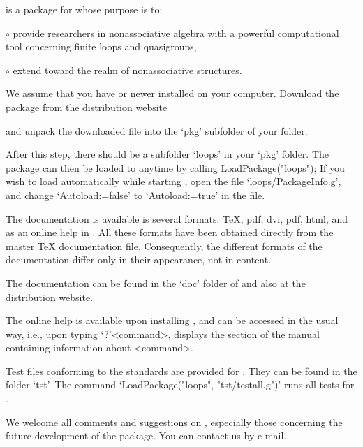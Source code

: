 
{\LOOPS} is a package for  whose purpose is to:
\beginlist%
\item{$\circ$}
    provide researchers in nonassociative algebra with a powerful computational tool
    concerning finite loops and quasigroups,
\item{$\circ$}
    extend {\GAP} toward the realm of nonassociative structures.
\endlist


We assume that you have  or newer installed on your computer.
Download the {\LOOPS} package from the distribution website


and unpack the downloaded file into the `pkg' subfolder of your {\GAP} folder.

After this step, there should be a subfolder `loops' in your `pkg' folder. The
package {\LOOPS} can then be loaded to {\GAP} anytime by calling
\begintt
LoadPackage("loops");
\endtt
If you wish to load {\LOOPS} automatically while starting {\GAP}, open the file
`loops/PackageInfo.g', and change `Autoload:=false' to
`Autoload:=true' in the file.


The documentation is available is several formats: \TeX, pdf, dvi, pdf, html,
and as an online help in {\GAP}. All these formats have been obtained directly
from the master {\TeX} documentation file. Consequently, the different formats
of the documentation differ only in their appearance, not in content.

The documentation can be found in the `doc' folder of {\LOOPS} and also at the
{\LOOPS} distribution website.

The online {\GAP} help is available upon installing {\LOOPS}, and can be
accessed in the usual way, i.e., upon typing `?'<command>, {\GAP} displays the
section of the {\LOOPS} manual containing information about <command>.


Test files conforming to the {\GAP} standards are provided for {\LOOPS}. They
can be found in the folder `tst'. The command `LoadPackage("loops",
"tst/testall.g")' runs all tests for {\LOOPS}.


We welcome all comments and suggestions on {\LOOPS}, especially those
concerning the future development of the package. You can contact us by e-mail.
